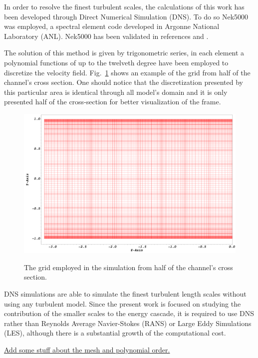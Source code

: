 \documentclass[twocolumn,10pt]{asme2e}
\begin{document}
In order to resolve the finest turbulent scales, the calculations of this work has been developed through Direct Numerical Simulation (DNS). To do so Nek5000 was employed, a spectral element code developed in Argonne National Laboratory (ANL). Nek5000 has been validated in references \cite{merzari2013} and \cite{Obabko2011}.

The solution of this method is given by trigonometric series, in each element a polynomial functions of up to the twelveth degree have been employed to discretize the velocity field. Fig.~\ref{fig:mesh} shows an example of the grid from half of the channel's cross section. One should notice that the discretization presented by this particular area is identical through all model's domain and it is only presented half of the cross-section for better visualization of the frame.

\begin{figure}[!htbp]
	\centering
	\scalebox{0.16}
	{\includegraphics{mesh.png}}
	\caption{The grid employed in the simulation from half of the channel's cross section.}
	\label{fig:mesh}
\end{figure}

DNS simulations are able to simulate the finest turbulent length scales without using any turbulent model. Since the present work is focused on studying the contribution of the smaller scales to the energy cascade, it is required to use DNS rather than Reynolds Average Navier-Stokes (RANS) or Large Eddy Simulations (LES), although there is a substantial growth of the computational cost.

\underline{Add some stuff about the mesh and polynomial order.}
\end{document}
